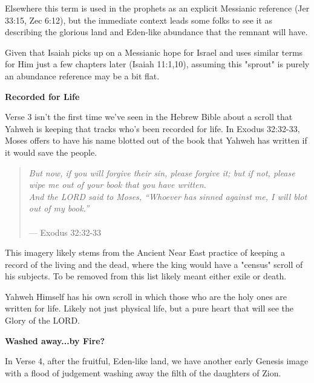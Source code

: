 \documentclass[11pt]{article}
\begin{document}
Elsewhere this term is used in the prophets as an explicit Messianic reference (Jer 33:15, Zec 6:12), but the immediate context leads some folks to see it as describing the glorious land and Eden-like abundance that the remnant will have.
\vspace{1em}

Given that Isaiah picks up on a Messianic hope for Israel and uses similar terms for Him just a few chapters later (Isaiah 11:1,10), assuming this "sprout" is purely an abundance reference may be a bit flat.


\vspace{3em}
{\large\bfseries Recorded for Life}
\vspace{1em}

Verse 3 isn't the first time we've seen in the Hebrew Bible about a scroll that Yahweh is keeping that tracks who's been recorded for life.
In Exodus 32:32-33, Moses offers to have his name blotted out of the book that Yahweh has written if it would save the people.

\begin{quote}
\textit{But now, if you will forgive their sin, please forgive it; but if not, please wipe me out of your book that you have written.
\\And the LORD said to Moses, “Whoever has sinned against me, I will blot out of my book.”}\\\\
\hfill --- Exodus 32:32-33
\end{quote}

{\vspace{1em}}

This imagery likely stems from the Ancient Near East practice of keeping a record of the living and the dead, where the king would have a "census" scroll of his subjects. To be removed from this list likely meant either exile or death.

{\vspace{1em}}

Yahweh Himself has his own scroll in which those who are the holy ones are written for life. Likely not just physical life, but a pure heart that will see the Glory of the LORD.


\vspace{3em}
{\large\bfseries Washed away...by Fire?}
\vspace{1em}

In Verse 4, after the fruitful, Eden-like land, we have another early Genesis image with a flood of judgement washing away the filth of the daughters of Zion.
\end{document}
